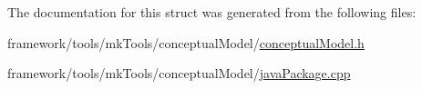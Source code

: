 The documentation for this struct was generated from the following files\+:\begin{DoxyCompactItemize}
\item 
framework/tools/mk\+Tools/conceptual\+Model/\hyperlink{conceptual_model_8h}{conceptual\+Model.\+h}\item 
framework/tools/mk\+Tools/conceptual\+Model/\hyperlink{java_package_8cpp}{java\+Package.\+cpp}\end{DoxyCompactItemize}
